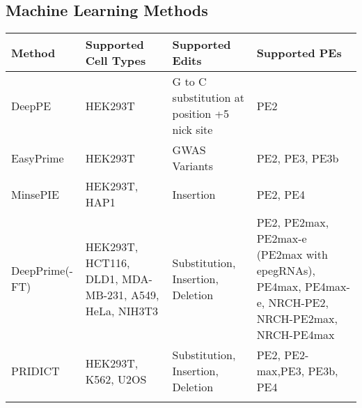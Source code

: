 \documentclass[12pt]{article}
\begin{document}
\subsection{Machine Learning Methods}
\label{sec:ml-methods}
\renewcommand{\arraystretch}{1.5}
\begin{table}
    \centering
    \begin{tabularx}{\textwidth}{p{}p{}p{}p{}}
        \textbf{Method}         & \textbf{Supported Cell Types}                                      & \textbf{Supported Edits}                                                                             & \textbf{Supported PEs}                                                                                                             \\
        \hline
        DeepPE         & HEK293T                                                   & G to C substitution at position +5 nick site & PE2                                                                                                                       \\
        EasyPrime     & HEK293T                                                   & GWAS Variants                                                                               & PE2, PE3, PE3b                                                                                                            \\
        MinsePIE       & HEK293T, HAP1                                              &      Insertion                                                                                       &        PE2, PE4                                                                                                                   \\
        DeepPrime(-FT) & HEK293T, HCT116, DLD1, MDA-MB-231, A549, HeLa, NIH3T3     & Substitution, Insertion, Deletion                                                           & PE2, PE2max, PE2max-e (PE2max with epegRNAs), PE4max, PE4max-e, NRCH-PE2, NRCH-PE2max, NRCH-PE4max \\
        PRIDICT        & HEK293T, K562, U2OS                                       & Substitution, Insertion, Deletion                                                           & PE2, PE2-max,PE3, PE3b, PE4                                                                                                         \\
        \hline
                       &                                                           &                                                                                             &                                                                                                                           \\

\end{tabularx}
\end{table}
\end{document}
